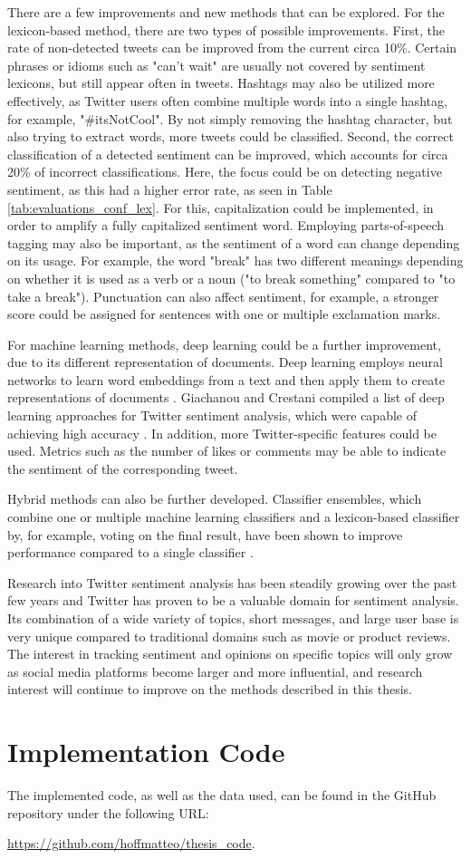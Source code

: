 There are a few improvements and new methods that can be explored. For the lexicon-based method, there are two types of possible improvements. First, the rate of non-detected tweets can be improved from the current circa 10\%. Certain phrases or idioms such as "can't wait" are usually not covered by sentiment lexicons, but still appear often in tweets. Hashtags may also be utilized more effectively, as Twitter users often combine multiple words into a single hashtag, for example, "\#itsNotCool". By not simply removing the hashtag character, but also trying to extract words, more tweets could be classified. Second, the correct classification of a detected sentiment can be improved, which accounts for circa 20\% of incorrect classifications. Here, the focus could be on detecting negative sentiment, as this had a higher error rate, as seen in Table \ref{tab:evaluations_conf_lex}. For this, capitalization could be implemented, in order to amplify a fully capitalized sentiment word. Employing parts-of-speech tagging may also be important, as the sentiment of a word can change depending on its usage. For example, the word "break" has two different meanings depending on whether it is used as a verb or a noun ("to break something" compared to "to take a break"). Punctuation can also affect sentiment, for example, a stronger score could be assigned for sentences with one or multiple exclamation marks.

For machine learning methods, deep learning could be a further improvement, due to its different representation of documents. Deep learning employs neural networks to learn word embeddings from a text and then apply them to create representations of documents \cite{DBLP:journals/csur/GiachanouC16}. Giachanou and Crestani compiled a list of deep learning approaches for Twitter sentiment analysis, which were capable of achieving high accuracy \cite{DBLP:journals/csur/GiachanouC16}. In addition, more Twitter-specific features could be used. Metrics such as the number of likes or comments may be able to indicate the sentiment of the corresponding tweet.

Hybrid methods can also be further developed. Classifier ensembles, which combine one or multiple machine learning classifiers and a lexicon-based classifier by, for example, voting on the final result, have been shown to improve performance compared to a single classifier \cite{DBLP:journals/csur/GiachanouC16}.

Research into Twitter sentiment analysis has been steadily growing over the past few years and Twitter has proven to be a valuable domain for sentiment analysis. Its combination of a wide variety of topics, short messages, and large user base is very unique compared to traditional domains such as movie or product reviews. The interest in tracking sentiment and opinions on specific topics will only grow as social media platforms become larger and more influential, and research interest will continue to improve on the methods described in this thesis.

\chapter{Implementation Code}
\label{cha:Chapter8_Code}
The implemented code, as well as the data used, can be found in the GitHub repository under the following URL: 

\url{https://github.com/hoffmatteo/thesis_code}.

